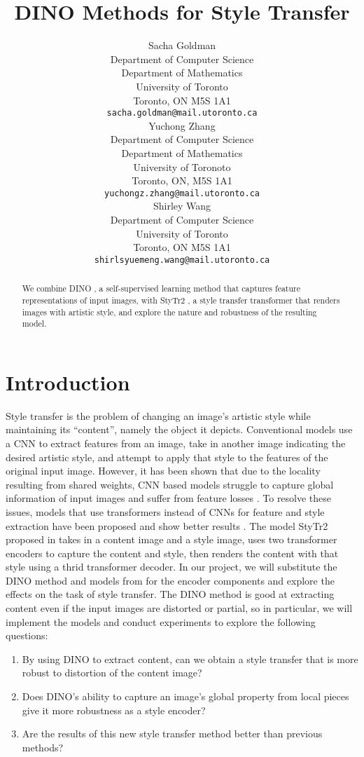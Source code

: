 \documentclass{article}
\title{DINO Methods for Style Transfer}
\author{
	Sacha Goldman \\
	Department of Computer Science\\ 
	Department of Mathematics\\
	University of Toronto\\
	Toronto, ON M5S 1A1 \\
	\texttt{sacha.goldman@mail.utoronto.ca} \\
	\And
	Yuchong Zhang \\
	Department of Computer Science \\
	Department of Mathematics \\
	University of Toronoto \\
	Toronto, ON, M5S 1A1 \\
	\texttt{yuchongz.zhang@mail.utoronto.ca} \\
	\And
	Shirley Wang \\
	Department of Computer Science \\
	University of Toronto \\
	Toronto, ON M5S 1A1 \\
	\texttt{shirlsyuemeng.wang@mail.utoronto.ca} \\
}
\begin{document}
\maketitle

\begin{abstract}
We combine DINO \cite{DINO}, a self-supervised learning method that captures feature representations of input images, with StyTr2 \cite{ImageStyleTransformer}, a style transfer transformer that renders images with artistic style, and explore the nature and robustness of the resulting model.
\end{abstract}

\section{Introduction}
Style transfer is the problem of changing an image's artistic style while maintaining its ``content'', namely the object it depicts. Conventional models use a CNN to extract features from an image, take in another image indicating the desired artistic style, and attempt to apply that style to the features of the original input image. However, it has been shown that due to the locality resulting from shared weights, CNN based models struggle to capture global information of input images and suffer from feature losses \cite{ImageStyleTransformer}. To resolve these issues, models that use transformers instead of CNNs for feature and style extraction have been proposed and show better results \cite{ImageStyleTransformer}. The model StyTr2 proposed in \cite{ImageStyleTransformer} takes in a content image and a style image, uses two transformer encoders to capture the content and style, then renders the content with that style using a thrid transformer decoder. In our project, we will substitute the DINO method and models from \cite{DINO} for the encoder components and explore the effects on the task of style transfer. The DINO method is good at extracting content even if the input images are distorted or partial, so in particular, we will implement the models and conduct experiments to explore the following questions:
\begin{enumerate}
	\item By using DINO to extract content, can we obtain a style transfer that is more robust to distortion of the content image?
	\item Does DINO's ability to capture an image's global property from local pieces give it more robustness as a style encoder?
	\item Are the results of this new style transfer method better than previous methods?
\end{enumerate}
\end{document}
